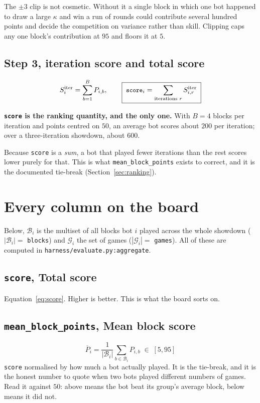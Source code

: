 \documentclass[11pt,a4paper]{article}
\newcommand{\code}[1]{\texttt{\small #1}}
\begin{document}
The $\pm 3$ clip is not cosmetic. Without it a single block in which one bot
happened to draw a large $\kappa$ and win a run of rounds could contribute
several hundred points and decide the competition on variance rather than skill.
Clipping caps any one block's contribution at $95$ and floors it at $5$.

\subsection{Step 3, iteration score and total score}
\begin{equation}
  S^{\text{iter}}_{i} = \sum_{b=1}^{B} P_{i,b},
  \qquad
  \boxed{\; \text{\code{score}}_i = \sum_{\text{iterations } r} S^{\text{iter}}_{i,r} \;}
  \label{eq:score}
\end{equation}

\noindent
\textbf{\code{score} is the ranking quantity, and the only one.} With $B = 4$
blocks per iteration and points centred on $50$, an average bot scores about
$200$ per iteration; over a three-iteration showdown, about $600$.

Because \code{score} is a \emph{sum}, a bot that played fewer iterations than the
rest scores lower purely for that. This is what \code{mean\_block\_points}
exists to correct, and it is the documented tie-break
(Section~\ref{sec:ranking}).

\section{Every column on the board}
\label{sec:metrics}

Below, $\mathcal{B}_i$ is the multiset of all blocks bot $i$ played across the
whole showdown ($|\mathcal{B}_i| = $ \code{blocks}) and $\mathcal{G}_i$ the set
of games ($|\mathcal{G}_i| = $ \code{games}). All of these are computed in
\code{harness/evaluate.py:aggregate}.

\subsection{\code{score}, Total score}
Equation~\eqref{eq:score}. Higher is better. This is what the board sorts on.

\subsection{\code{mean\_block\_points}, Mean block score}
\begin{equation}
  \overline{P}_i = \frac{1}{|\mathcal{B}_i|} \sum_{b \in \mathcal{B}_i} P_{i,b}
  \;\in\; [5, 95]
\end{equation}
\code{score} normalised by how much a bot actually played. It is the tie-break,
and it is the honest number to quote when two bots played different numbers of
games. Read it against $50$: above means the bot beat its group's average block,
below means it did not.
\end{document}

